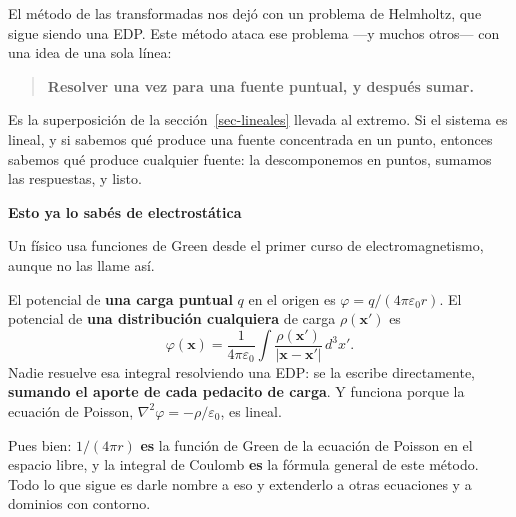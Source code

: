 \documentclass[
  spanish,
  a4paper,
]{scrbook}
\theoremstyle{definition}
\theoremstyle{plain}
\theoremstyle{definition}
\theoremstyle{plain}
\theoremstyle{definition}
\theoremstyle{remark}
\begin{document}
El método de las transformadas nos dejó con un problema de Helmholtz,
que sigue siendo una EDP. Este método ataca ese problema ---y muchos
otros--- con una idea de una sola línea:

\begin{quote}
\textbf{Resolver una vez para una fuente puntual, y después sumar.}
\end{quote}

Es la superposición de la sección~\ref{sec-lineales} llevada al extremo.
Si el sistema es lineal, y si sabemos qué produce una fuente concentrada
en un punto, entonces sabemos qué produce cualquier fuente: la
descomponemos en puntos, sumamos las respuestas, y listo.

\begin{tcolorbox}[enhanced jigsaw, arc=.35mm, bottomrule=.15mm, breakable, colback=white, colframe=quarto-callout-important-color-frame, left=2mm, leftrule=.75mm, opacityback=0, rightrule=.15mm, toprule=.15mm]
\begin{minipage}[t]{5.5mm}
\textcolor{quarto-callout-important-color}{\faExclamation}
\end{minipage}%
\begin{minipage}[t]{\textwidth - 5.5mm}

\vspace{-3mm}\textbf{Esto ya lo sabés de electrostática}\vspace{3mm}

Un físico usa funciones de Green desde el primer curso de
electromagnetismo, aunque no las llame así.

El potencial de \textbf{una carga puntual} \(q\) en el origen es
\(\varphi = q/(4\pi\varepsilon_0 r)\). El potencial de \textbf{una
distribución cualquiera} de carga \(\rho(\mathbf{x}')\) es \[
\varphi(\mathbf{x}) = \frac{1}{4\pi\varepsilon_0}
\int \frac{\rho(\mathbf{x}')}{|\mathbf{x}-\mathbf{x}'|}\,d^3x' .
\] Nadie resuelve esa integral resolviendo una EDP: se la escribe
directamente, \textbf{sumando el aporte de cada pedacito de carga}. Y
funciona porque la ecuación de Poisson,
\(\nabla^2\varphi = -\rho/\varepsilon_0\), es lineal.

Pues bien: \(1/(4\pi r)\) \textbf{es} la función de Green de la ecuación
de Poisson en el espacio libre, y la integral de Coulomb \textbf{es} la
fórmula general de este método. Todo lo que sigue es darle nombre a eso
y extenderlo a otras ecuaciones y a dominios con contorno.

\end{minipage}%
\end{tcolorbox}
\end{document}
